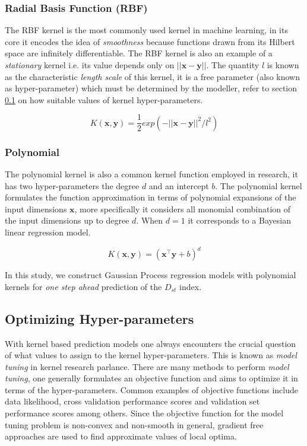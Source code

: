 \documentclass[referee,a4paper,12pt,traditabstract]{swsc}
\begin{document}
\begin{linenumbers}
\subsubsection{Radial Basis Function (RBF)}

The RBF kernel is the most commonly used kernel in machine learning, in its core it encodes the idea of \emph{smoothness} because functions drawn from its Hilbert space are infinitely differentiable. The RBF kernel is also an example of a \emph{stationary} kernel i.e. its value depends only on $||\mathbf{x} - \mathbf{y}||$. The quantity $l$ is known as the characteristic \emph{length scale} of this kernel, it is a free parameter (also known as hyper-parameter) which must be determined by the modeller, refer to section \ref{sec:hyp} on how suitable values of kernel hyper-parameters.

\begin{equation}
    K(\mathbf{x}, \mathbf{y}) = \frac{1}{2} exp(-||\mathbf{x} - \mathbf{y}||^2/l^2)
\end{equation}
    
    
\subsubsection{Polynomial}

The polynomial kernel is also a common kernel function employed in research, it has two hyper-parameters the degree $d$ and an intercept $b$. The polynomial kernel formulates the function approximation in terms of polynomial expansions of the input dimensions $\mathbf{x}$, more specifically it considers all monomial combination of the input dimensions up to degree $d$. When $d = 1$ it corresponds to a Bayesian linear regression model. 

\begin{equation}
    K(\mathbf{x}, \mathbf{y}) = (\mathbf{x}^\intercal \mathbf{y} + b)^d 
\end{equation}

In this study, we construct Gaussian Process regression models with polynomial kernels for \emph{one step ahead} prediction of the $D_{st}$ index. 


\subsection{Optimizing Hyper-parameters} \label{sec:hyp}

With kernel based prediction models one always encounters the crucial question of what values to assign to the kernel hyper-parameters. This is known as \emph{model tuning} in kernel research parlance. There are many methods to perform \emph{model tuning}, one generally formulates an objective function and aims to optimize it in terms of the hyper-parameters. Common examples of objective functions include data likelihood, cross validation performance scores and validation set performance scores among others. Since the objective function for the model tuning problem is non-convex and non-smooth in general, gradient free approaches are used to find approximate values of local optima.


\end{linenumbers}
\end{document}
